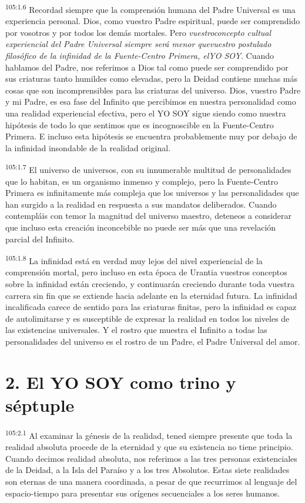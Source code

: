 \documentclass[twoside, 11pt]{book}
\begin{document}
\par
\textsuperscript{105:1.6} Recordad siempre que la comprensión humana del Padre Universal es una experiencia personal. Dios, como vuestro Padre espiritual, puede ser comprendido por vosotros y por todos los demás mortales. Pero \textit{vuestroconcepto cultual experiencial del Padre Universal siempre será menor quevuestro postulado filosófico de la infinidad de la Fuente-Centro Primera, elYO SOY}. Cuando hablamos del Padre, nos referimos a Dios tal como puede ser comprendido por sus criaturas tanto humildes como elevadas, pero la Deidad contiene muchas más cosas que son incomprensibles para las criaturas del universo. Dios, vuestro Padre y mi Padre, es esa fase del Infinito que percibimos en nuestra personalidad como una realidad experiencial efectiva, pero el YO SOY sigue siendo como nuestra hipótesis de todo lo que sentimos que es incognoscible en la Fuente-Centro Primera. E incluso esta hipótesis se encuentra probablemente muy por debajo de la infinidad insondable de la realidad original.

\par
\textsuperscript{105:1.7} El universo de universos, con su innumerable multitud de personalidades que lo habitan, es un organismo inmenso y complejo, pero la Fuente-Centro Primera es infinitamente más compleja que los universos y las personalidades que han surgido a la realidad en respuesta a sus mandatos deliberados. Cuando contempláis con temor la magnitud del universo maestro, deteneos a considerar que incluso esta creación inconcebible no puede ser más que una revelación parcial del Infinito.

\par
\textsuperscript{105:1.8} La infinidad está en verdad muy lejos del nivel experiencial de la comprensión mortal, pero incluso en esta época de Urantia vuestros conceptos sobre la infinidad están creciendo, y continuarán creciendo durante toda vuestra carrera sin fin que se extiende hacia adelante en la eternidad futura. La infinidad incalificada carece de sentido para las criaturas finitas, pero la infinidad es capaz de autolimitarse y es susceptible de expresar la realidad en todos los niveles de las existencias universales. Y el rostro que muestra el Infinito a todas las personalidades del universo es el rostro de un Padre, el Padre Universal del amor.

\section*{2. El YO SOY como trino y séptuple}
\par
\textsuperscript{105:2.1} Al examinar la génesis de la realidad, tened siempre presente que toda la realidad absoluta procede de la eternidad y que su existencia no tiene principio. Cuando decimos realidad absoluta, nos referimos a las tres personas existenciales de la Deidad, a la Isla del Paraíso y a los tres Absolutos. Estas siete realidades son eternas de una manera coordinada, a pesar de que recurrimos al lenguaje del espacio-tiempo para presentar sus orígenes secuenciales a los seres humanos.
\end{document}
